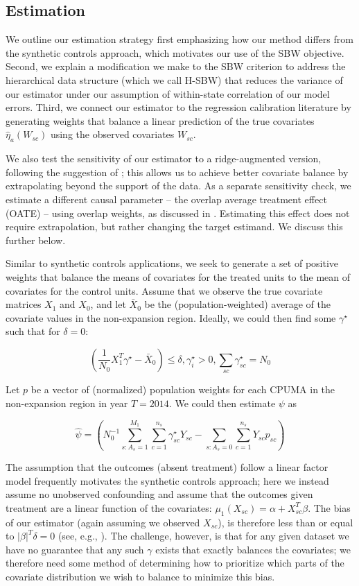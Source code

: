 \documentclass[aoas]{imsart}
\theoremstyle{plain}
\theoremstyle{remark}
\begin{document}
\subsection{Estimation}

We outline our estimation strategy first emphasizing how our method differs from the synthetic controls approach, which motivates our use of the SBW objective. Second, we explain a modification we make to the SBW criterion to address the hierarchical data structure (which we call H-SBW) that reduces the variance of our estimator under our assumption of within-state correlation of our model errors. Third, we connect our estimator to the regression calibration literature by generating weights that balance a linear prediction of the true covariates $\hat{\eta}_a(W_{sc})$ using the observed covariates $W_{sc}$. 

We also test the sensitivity of our estimator to a ridge-augmented version, following the suggestion of \cite{ben2018augmented}; this allows us to achieve better covariate balance by extrapolating beyond the support of the data. As a separate sensitivity check, we estimate a different causal parameter -- the overlap average treatment effect (OATE) -- using overlap weights, as discussed in \cite{li2018balancing}. Estimating this effect does not require extrapolation, but rather changing the target estimand. We discuss this further below.

Similar to synthetic controls applications, we seek to generate a set of positive weights that balance the means of covariates for the treated units to the mean of covariates for the control units. Assume that we observe the true covariate matrices $X_1$ and $X_0$, and let $\bar{X}_0$ be the (population-weighted) average of the covariate values in the non-expansion region. Ideally, we could then find some $\gamma^\star$ such that for $\delta = 0$: 

$$
(\frac{1}{N_0}X_1^T\gamma^\star - \bar{X}_0) \le \delta, \gamma_i^\star > 0, \sum_{sc} \gamma_{sc}^\star = N_0
$$

Let $p$ be a vector of (normalized) population weights for each CPUMA in the non-expansion region in year $T = 2014$. We could then estimate $\psi$ as

$$
\hat{\psi} = (N_0^{-1}\sum_{s: A_s = 1}^{M_1}\sum_{c = 1}^{n_s}\gamma_{sc}^\star Y_{sc} - \sum_{s: A_s = 0}\sum_{c = 1}^{n_s}Y_{sc}p_{sc})
$$

The assumption that the outcomes (absent treatment) follow a linear factor model frequently motivates the synthetic controls approach; here we instead assume no unobserved confounding and assume that the outcomes given treatment are a linear function of the covariates: $\mu_1(X_{sc}) = \alpha + X_{sc}^T\beta$. The bias of our estimator (again assuming we observed $X_{sc}$), is therefore less than or equal to $\lvert\beta\rvert^T\delta = 0$ (see, e.g., \cite{zubizarreta2015stable}). The challenge, however, is that for any given dataset we have no guarantee that any such $\gamma$ exists that exactly balances the covariates; we therefore need some method of determining how to prioritize which parts of the covariate distribution we wish to balance to minimize this bias.
\end{document}
